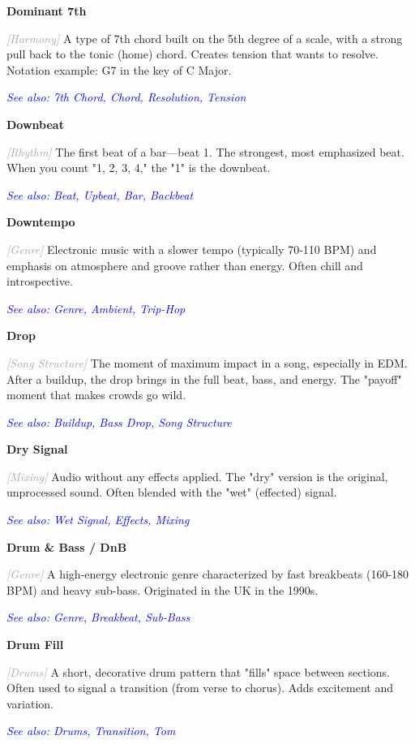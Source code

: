 \documentclass[11pt,letterpaper]{article}
\newcommand{\term}[1]{\textbf{\large\color{purple}#1}}
\newcommand{\category}[1]{\textcolor{darkgray}{\textit{\small [#1]}}}
\newcommand{\seealso}[1]{\textcolor{blue}{\textit{See also: #1}}}
\newenvironment{termdef}[1]
  {\noindent\term{#1}\par\nopagebreak}
  {\par\vspace{0.3em}}
\begin{document}
\begin{termdef}{Dominant 7th}
\category{Harmony}
A type of 7th chord built on the 5th degree of a scale, with a strong pull back to the tonic (home) chord. Creates tension that wants to resolve. Notation example: G7 in the key of C Major.

\seealso{7th Chord, Chord, Resolution, Tension}
\end{termdef}

\begin{termdef}{Downbeat}
\category{Rhythm}
The first beat of a bar—beat 1. The strongest, most emphasized beat. When you count "1, 2, 3, 4," the "1" is the downbeat.

\seealso{Beat, Upbeat, Bar, Backbeat}
\end{termdef}

\begin{termdef}{Downtempo}
\category{Genre}
Electronic music with a slower tempo (typically 70-110 BPM) and emphasis on atmosphere and groove rather than energy. Often chill and introspective.

\seealso{Genre, Ambient, Trip-Hop}
\end{termdef}

\begin{termdef}{Drop}
\category{Song Structure}
The moment of maximum impact in a song, especially in EDM. After a buildup, the drop brings in the full beat, bass, and energy. The "payoff" moment that makes crowds go wild.

\seealso{Buildup, Bass Drop, Song Structure}
\end{termdef}

\begin{termdef}{Dry Signal}
\category{Mixing}
Audio without any effects applied. The "dry" version is the original, unprocessed sound. Often blended with the "wet" (effected) signal.

\seealso{Wet Signal, Effects, Mixing}
\end{termdef}

\begin{termdef}{Drum \& Bass / DnB}
\category{Genre}
A high-energy electronic genre characterized by fast breakbeats (160-180 BPM) and heavy sub-bass. Originated in the UK in the 1990s.

\seealso{Genre, Breakbeat, Sub-Bass}
\end{termdef}

\begin{termdef}{Drum Fill}
\category{Drums}
A short, decorative drum pattern that "fills" space between sections. Often used to signal a transition (from verse to chorus). Adds excitement and variation.

\seealso{Drums, Transition, Tom}
\end{termdef}
\end{document}
